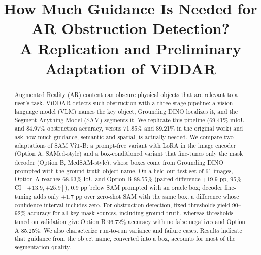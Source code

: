 \documentclass[conference]{IEEEtran}
\begin{document}

\title{How Much Guidance Is Needed for AR Obstruction Detection?\\
A Replication and Preliminary Adaptation of ViDDAR}

\author{
\and
{}
}

\maketitle


\begin{abstract}
Augmented Reality (AR) content can obscure physical objects that are relevant to a user's task. ViDDAR detects such obstruction with a three-stage pipeline: a vision-language model (VLM) names the key object, Grounding DINO localizes it, and the Segment Anything Model (SAM) segments it. We replicate this pipeline (69.41\% mIoU and 84.97\% obstruction accuracy, versus 71.85\% and 89.21\% in the original work) and ask how much guidance, semantic and spatial, is actually needed. We compare two adaptations of SAM ViT-B: a prompt-free variant with LoRA in the image encoder (Option A, SAMed-style) and a box-conditioned variant that fine-tunes only the mask decoder (Option B, MedSAM-style), whose boxes come from Grounding DINO prompted with the ground-truth object name. On a held-out test set of 61 images, Option A reaches 68.63\% IoU and Option B 88.55\% (paired difference $+19.9$ pp, 95\% CI $[+13.9,+25.9]$), 0.9 pp below SAM prompted with an oracle box; decoder fine-tuning adds only $+1.7$ pp over zero-shot SAM with the same box, a difference whose confidence interval includes zero. For obstruction detection, fixed thresholds yield 90--92\% accuracy for all key-mask sources, including ground truth, whereas thresholds tuned on validation give Option B 96.72\% accuracy with no false negatives and Option A 85.25\%. We also characterize run-to-run variance and failure cases. Results indicate that guidance from the object name, converted into a box, accounts for most of the segmentation quality.
\end{abstract}
\end{document}
